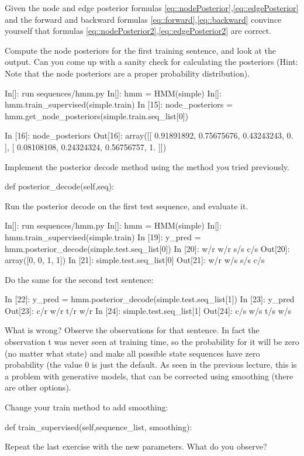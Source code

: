 \begin{exercise}
Given the node and edge posterior formulas \ref{eq::nodePosterior},\ref{eq::edgePosterior} and the
  forward and backward formulas \ref{eq::forward},\ref{eq::backward} convince yourself that formulas
  \ref{eq::nodePosterior2},\ref{eq::edgePosterior2} are correct. 

Compute the node posteriors for the first training sentence, and look at
the output. Can you come up with a sanity check for calculating the
posteriors (Hint: Note that the node posteriors are a proper
probability distribution).

\begin{python}
In[]:  run sequences/hmm.py
In[]: hmm = HMM(simple)
In[]: hmm.train_supervised(simple.train)
In [15]: node_posteriors = hmm.get_node_posteriors(simple.train.seq_list[0])

In [16]: node_posteriors
Out[16]: 
array([[ 0.91891892,  0.75675676,  0.43243243,  0.        ],
       [ 0.08108108,  0.24324324,  0.56756757,  1.        ]])
\end{python}

Implement the posterior decode method using the method you tried previously. 
\begin{python}
def posterior_decode(self,seq):
\end{python}

Run the posterior decode on the first test sequence, and evaluate it.
 
\begin{python}
In[]:  run sequences/hmm.py
In[]: hmm = HMM(simple)
In[]: hmm.train_supervised(simple.train)
In [19]: y_pred = hmm.posterior_decode(simple.test.seq_list[0])
In [20]: w/r w/r s/s c/s
Out[20]: array([0, 0, 1, 1])
In [21]: simple.test.seq_list[0]
Out[21]: w/r w/s s/s c/s
\end{python}

Do the same for the second test sentence:
\begin{python}
In [22]: y_pred = hmm.posterior_decode(simple.test.seq_list[1])
In [23]: y_pred
Out[23]: c/r w/r t/r w/r
In [24]: simple.test.seq_list[1]
Out[24]: c/s w/s t/s w/s 
\end{python}

What is wrong? Observe the observations for that sentence. In fact the
observation t was never seen at training time, so the probability for
it will be zero (no matter what state) and make all possible state
sequences have zero probability (the value 0 is just the default.
As seen in the previous lecture, this is a problem with generative
models, that can be corrected using smoothing (there are other
options).

Change your train method to add smoothing:
\begin{python}
def train_supervised(self,sequence_list, smoothing):
\end{python}

Repeat the last exercise with the new parameters. What do you observe?
\end{exercise}


